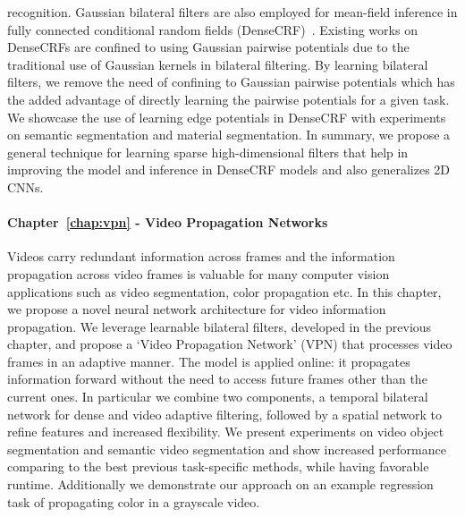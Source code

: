 recognition. Gaussian bilateral filters are also employed for mean-field inference in fully connected
conditional random fields (DenseCRF)~\cite{krahenbuhl2012efficient}. Existing works on DenseCRFs
are confined to using Gaussian pairwise potentials due to the traditional use of Gaussian kernels
in bilateral filtering. By learning bilateral filters, we remove the need of confining
to Gaussian pairwise potentials which has the added advantage of directly learning the pairwise potentials
for a given task. We showcase the use of learning edge potentials in DenseCRF with experiments
on semantic segmentation and material segmentation. In summary, we propose a general technique
for learning sparse high-dimensional filters that help in improving the model and inference in DenseCRF
models and also generalizes 2D CNNs.

\vspace{-0.3cm}
\paragraph{Chapter~\ref{chap:vpn} - Video Propagation Networks}
Videos carry redundant information across frames and the information propagation across video
frames is valuable for many computer vision applications such as video segmentation, color
propagation etc. In this chapter, we propose a novel neural network architecture for video
information propagation. We leverage learnable bilateral filters, developed in the previous
chapter, and propose a `Video Propagation Network' (VPN) that processes video frames in an
adaptive manner. The model is applied online: it propagates information forward without
the need to access future frames other than the current ones. In particular we combine
two components, a temporal bilateral network for dense and video adaptive filtering,
followed by a spatial network to refine features and increased flexibility.
We present experiments on video object segmentation and semantic video segmentation
and show increased performance comparing to the best previous task-specific methods,
while having favorable runtime. Additionally we demonstrate our approach on an example
regression task of propagating color in a grayscale video.

\vspace{-0.3cm}
